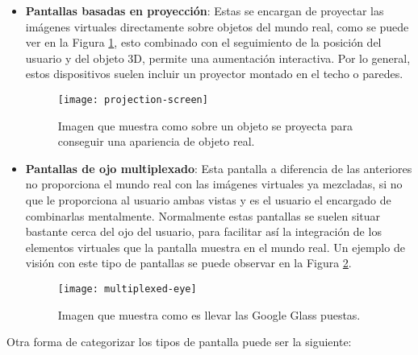 \begin{itemize}
  \newpage

  \item \textbf{Pantallas basadas en proyección}: Estas se encargan de proyectar las imágenes virtuales directamente sobre objetos del mundo real, como se puede ver en la Figura \ref{figura-pantalla-proyeccion}, esto combinado con el seguimiento de la posición del usuario y del objeto 3D, permite una aumentación interactiva. Por lo general, estos dispositivos suelen incluir un proyector montado en el techo o paredes.

  \begin{figure}[h]
    \centering
    \texttt{[image: projection-screen]}
    \caption{Imagen que muestra como sobre un objeto se proyecta para conseguir una apariencia de objeto real.\protect\footnotemark}
    \label{figura-pantalla-proyeccion}
  \end{figure}


  \item \textbf{Pantallas de ojo multiplexado}: Esta pantalla a diferencia de las anteriores no proporciona el mundo real con las imágenes virtuales ya mezcladas, si no que le proporciona al usuario ambas vistas y es el usuario el encargado de combinarlas mentalmente. Normalmente estas pantallas se suelen situar bastante cerca del ojo del usuario, para facilitar así la integración de los elementos virtuales que la pantalla muestra en el mundo real. Un ejemplo de visión con este tipo de pantallas se puede observar en la Figura \ref{figura-ojo-multiplexado}.

  \begin{figure}[h]
    \centering
    \texttt{[image: multiplexed-eye]}
    \caption{Imagen que muestra como es llevar las Google Glass puestas.\protect\footnotemark}
    \label{figura-ojo-multiplexado}
  \end{figure}


\end{itemize}

\newpage

\begin{flushleft}
Otra forma de categorizar los tipos de pantalla puede ser la siguiente:
\end{flushleft}


